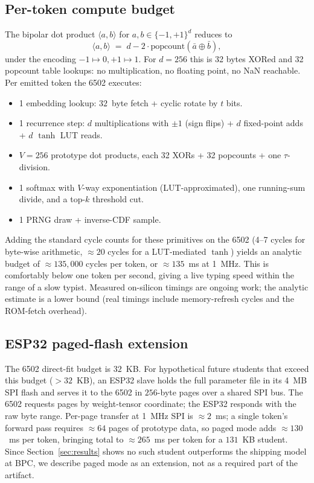 \documentclass[runningheads]{llncs}
\newcommand{\bipset}{\{-1,+1\}}
\begin{document}
\subsection{Per-token compute budget}

The bipolar dot product $\langle a,b\rangle$ for
$a,b\in\bipset^{d}$ reduces to
\begin{equation}
\langle a,b\rangle \;=\; d - 2\cdot \mathrm{popcount}(\bar a \oplus \bar b),
\label{eq:xorpop}
\end{equation}
under the encoding $-1\mapsto 0, +1\mapsto 1$. For $d{=}256$ this is
32 bytes XORed and 32 popcount table lookups: no multiplication, no
floating point, no NaN reachable. Per emitted token the 6502 executes:

\begin{itemize}
  \item 1 embedding lookup: $32$~byte fetch + cyclic rotate by $t$ bits.
  \item 1 recurrence step: $d$ multiplications with $\pm 1$ (sign
        flips) + $d$ fixed-point adds + $d$ $\tanh$ LUT reads.
  \item $V{=}256$ prototype dot products, each 32 XORs + 32 popcounts
        + one $\tau$-division.
  \item 1 softmax with $V$-way exponentiation (LUT-approximated),
        one running-sum divide, and a top-$k$ threshold cut.
  \item 1 PRNG draw + inverse-CDF sample.
\end{itemize}

Adding the standard cycle counts for these primitives on the 6502
(4--7 cycles for byte-wise arithmetic, ${\approx}20$ cycles for a
LUT-mediated $\tanh$) yields an analytic budget of
${\approx}135{,}000$ cycles per token, or ${\approx}135$~ms at 1~MHz.
This is comfortably below one token per second, giving a live typing
speed within the range of a slow typist. Measured on-silicon timings
are ongoing work; the analytic estimate is a lower bound (real
timings include memory-refresh cycles and the ROM-fetch overhead).

\subsection{ESP32 paged-flash extension}

The 6502 direct-fit budget is $32$~KB. For hypothetical future
students that exceed this budget (${>}32$~KB), an ESP32 slave holds
the full parameter file in its 4~MB SPI flash and serves it to the
6502 in $256$-byte pages over a shared SPI bus. The 6502 requests
pages by weight-tensor coordinate; the ESP32 responds with the raw
byte range. Per-page transfer at 1~MHz SPI is ${\approx}2$~ms; a
single token's forward pass requires ${\approx}64$ pages of
prototype data, so paged mode adds ${\approx}130$~ms per token,
bringing total to ${\approx}265$~ms per token for a $131$~KB
student. Since Section~\ref{sec:results} shows no such student
outperforms the shipping model at BPC, we describe paged mode as an
extension, not as a required part of the artifact.
\end{document}
